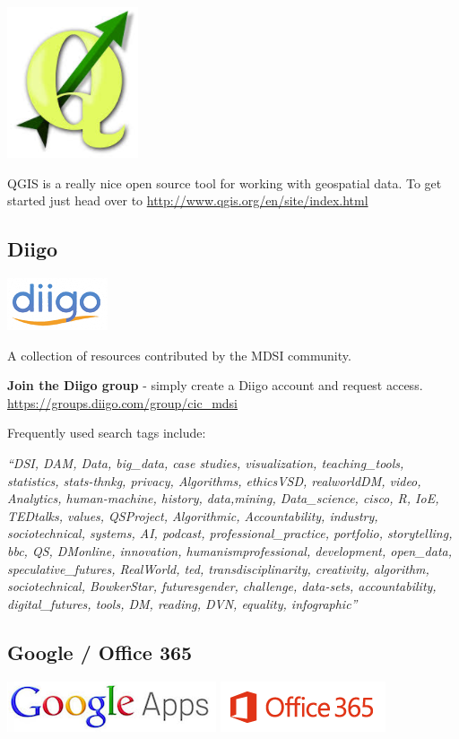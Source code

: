 \documentclass[]{book}
\theoremstyle{definition}
\theoremstyle{definition}
\theoremstyle{remark}
\begin{document}
\includegraphics[width=0.2\linewidth]{images/QGISlogo}

QGIS is a really nice open source tool for working with geospatial data.
To get started just head over to
\url{http://www.qgis.org/en/site/index.html}

\subsection{Diigo}\label{diigo}

\includegraphics[width=0.3\linewidth]{images/diigologo}

A collection of resources contributed by the MDSI community.

\textbf{Join the Diigo group} - simply create a Diigo account and
request access. \url{https://groups.diigo.com/group/cic_mdsi}

Frequently used search tags include:

\emph{``DSI, DAM, Data, big\_data, case studies, visualization,
teaching\_tools, statistics, stats-thnkg, privacy, Algorithms,
ethicsVSD, realworldDM, video, Analytics, human-machine, history,
data,mining, Data\_science, cisco, R, IoE, TEDtalks, values, QSProject,
Algorithmic, Accountability, industry, sociotechnical, systems, AI,
podcast, professional\_practice, portfolio, storytelling, bbc, QS,
DMonline, innovation, humanismprofessional, development, open\_data,
speculative\_futures, RealWorld, ted, transdisciplinarity, creativity,
algorithm, sociotechnical, BowkerStar, futuresgender, challenge,
data-sets, accountability, digital\_futures, tools, DM, reading, DVN,
equality, infographic''}

\subsection{Google / Office 365}\label{google-office-365}

\includegraphics{Images/GoogleAppslogo.png}
\includegraphics{Images/Office365logo.png}
\end{document}
